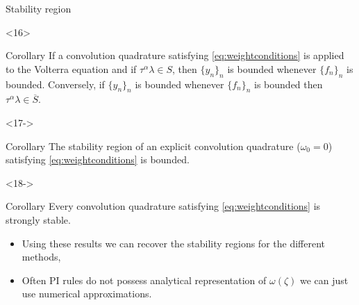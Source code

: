 \documentclass[aspectratio=169,xcolor=dvipsnames]{beamer}
\begin{document}
\begin{frame}{Stability region}
{{}
}
\begin{onlyenv}<16>
\begin{alertblock}{Corollary}
If a convolution quadrature satisfying \eqref{eq:weightconditions} is applied to the Volterra equation and if $\tau^\alpha \lambda \in S$, then $\{y_n\}_n$ is bounded whenever $\{f_n\}_n$ is bounded. Conversely, if $\{y_n\}_n$ is bounded whenever $\{f_n\}_n$ is bounded then $\tau^\alpha \lambda \in \overline{S}$.
\end{alertblock}
\end{onlyenv}
\begin{onlyenv}<17->
	\begin{alertblock}{Corollary}
	The stability region of an explicit convolution quadrature ($\omega_0 = 0$) satisfying \eqref{eq:weightconditions} is bounded.
	\end{alertblock}
\end{onlyenv}
\begin{onlyenv}<18->
\begin{alertblock}{Corollary}
Every convolution quadrature satisfying \eqref{eq:weightconditions} is strongly stable.
\end{alertblock}
\begin{itemize}
	\item[\faCogs] Using these results we can recover the stability regions for the different methods,
	\item[\faExclamationTriangle] Often PI rules do not possess analytical
	representation of $\omega(\zeta)$ we can just use numerical approximations.
\end{itemize}
\end{onlyenv}
\end{frame}
\end{document}
